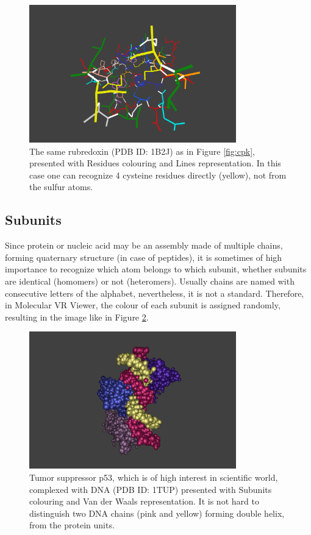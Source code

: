 \begin{figure}[!htb]
\centering    
\includegraphics[width=0.8\textwidth]{Figs/residues.png}
\caption{The same rubredoxin (PDB ID: 1B2J) as in Figure \ref{fig:cpk}, presented with Residues colouring and Lines representation. In this case one can recognize 4 cysteine residues directly (yellow), not from the sulfur atoms.}
\label{fig:residues} 
\end{figure}

\subsection{Subunits}

Since protein or nucleic acid may be an assembly made of multiple chains, forming quaternary structure (in case of peptides), it is sometimes of high importance to recognize which atom belongs to which subunit, whether subunits are identical (homomers) or not (heteromers). Usually chains are named with consecutive letters of the alphabet, nevertheless, it is not a standard. Therefore, in Molecular VR Viewer, the colour of each subunit is assigned randomly, resulting in the image like in Figure \ref{fig:subunits}.

\begin{figure}[!htb]
\centering    
\includegraphics[width=0.8\textwidth]{Figs/subunits.png}
\caption{Tumor suppressor p53, which is of high interest in scientific world, complexed with DNA (PDB ID: 1TUP) presented with Subunits colouring and Van der Waals representation. It is not hard to distinguish two DNA chains (pink and yellow) forming double helix, from the protein units.}
\label{fig:subunits} 
\end{figure}


